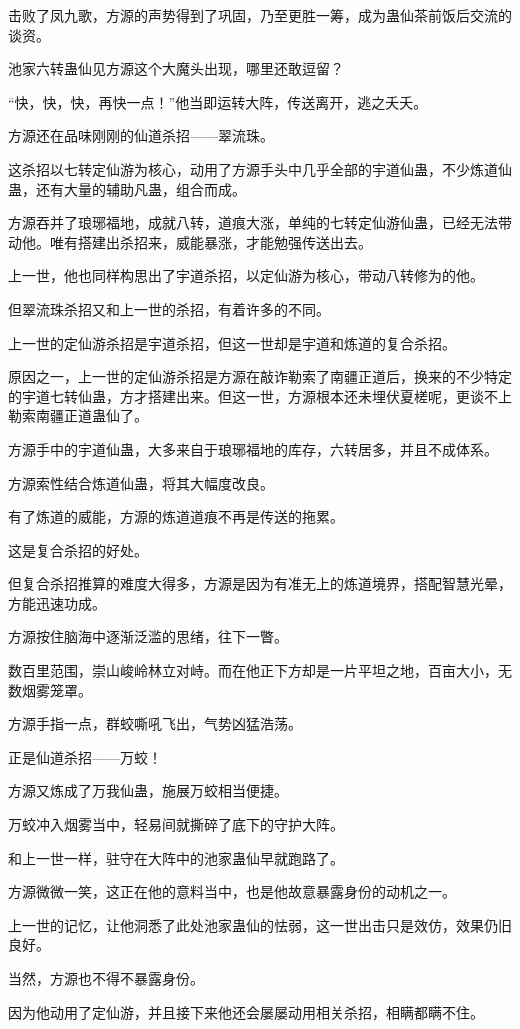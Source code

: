 \begin{this_body}
击败了凤九歌，方源的声势得到了巩固，乃至更胜一筹，成为蛊仙茶前饭后交流的谈资。

池家六转蛊仙见方源这个大魔头出现，哪里还敢逗留？

“快，快，快，再快一点！”他当即运转大阵，传送离开，逃之夭夭。

方源还在品味刚刚的仙道杀招——翠流珠。

这杀招以七转定仙游为核心，动用了方源手头中几乎全部的宇道仙蛊，不少炼道仙蛊，还有大量的辅助凡蛊，组合而成。

方源吞并了琅琊福地，成就八转，道痕大涨，单纯的七转定仙游仙蛊，已经无法带动他。唯有搭建出杀招来，威能暴涨，才能勉强传送出去。

上一世，他也同样构思出了宇道杀招，以定仙游为核心，带动八转修为的他。

但翠流珠杀招又和上一世的杀招，有着许多的不同。

上一世的定仙游杀招是宇道杀招，但这一世却是宇道和炼道的复合杀招。

原因之一，上一世的定仙游杀招是方源在敲诈勒索了南疆正道后，换来的不少特定的宇道七转仙蛊，方才搭建出来。但这一世，方源根本还未埋伏夏槎呢，更谈不上勒索南疆正道蛊仙了。

方源手中的宇道仙蛊，大多来自于琅琊福地的库存，六转居多，并且不成体系。

方源索性结合炼道仙蛊，将其大幅度改良。

有了炼道的威能，方源的炼道道痕不再是传送的拖累。

这是复合杀招的好处。

但复合杀招推算的难度大得多，方源是因为有准无上的炼道境界，搭配智慧光晕，方能迅速功成。

方源按住脑海中逐渐泛滥的思绪，往下一瞥。

数百里范围，崇山峻岭林立对峙。而在他正下方却是一片平坦之地，百亩大小，无数烟雾笼罩。

方源手指一点，群蛟嘶吼飞出，气势凶猛浩荡。

正是仙道杀招——万蛟！

方源又炼成了万我仙蛊，施展万蛟相当便捷。

万蛟冲入烟雾当中，轻易间就撕碎了底下的守护大阵。

和上一世一样，驻守在大阵中的池家蛊仙早就跑路了。

方源微微一笑，这正在他的意料当中，也是他故意暴露身份的动机之一。

上一世的记忆，让他洞悉了此处池家蛊仙的怯弱，这一世出击只是效仿，效果仍旧良好。

当然，方源也不得不暴露身份。

因为他动用了定仙游，并且接下来他还会屡屡动用相关杀招，相瞒都瞒不住。

\end{this_body}

